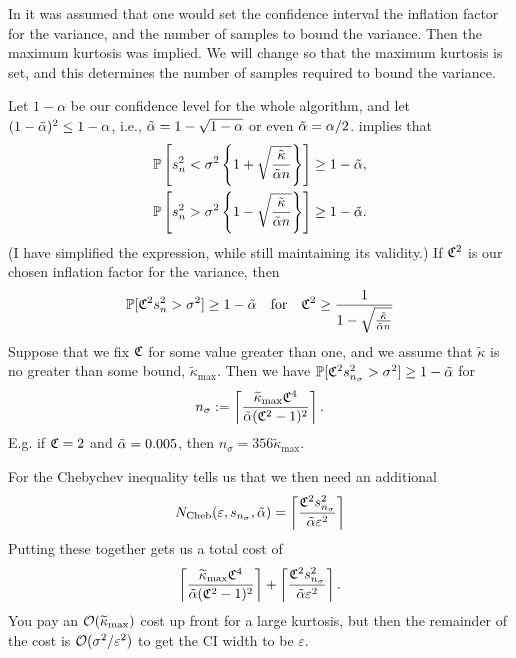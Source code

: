 \documentclass{amsart}
\newcommand{\tkappa}{\widetilde{\kappa}}
\newcommand{\tkmax}{\tkappa_{\max}}
\begin{document}
In \cite{HicEtal14a} it was assumed that one would set the confidence interval the inflation factor for the variance, and the number of samples to bound the variance.  Then the maximum kurtosis was implied.  We will change so that the maximum kurtosis is set, and this determines the number of samples required to bound the variance.

Let $1-\alpha$ be our confidence level for the whole algorithm, and let $(1 - \tilde{\alpha})^2 \le 1 - \alpha$, i.e., $\tilde{\alpha} = 1 - \sqrt{1-\alpha}$ or even $\tilde{\alpha} = \alpha/2$.   \citet[(12)]{HicEtal14a} implies that 
\begin{subequations} \label{sampvarbd}
	\begin{gather}\label{sampvarup}
		\operatorname{\mathbb{P}}\left[s^2_n < \sigma^2 \left\{1 + \sqrt{\frac{\tilde\kappa}{\tilde{\alpha} n}}\right\} \right] \ge 1 - \tilde{\alpha}, \\
		\label{sampvarlo}
		\operatorname{\mathbb{P}}\left[s^2_n > \sigma^2 \left\{1 - \sqrt{\frac{\tilde\kappa}{\tilde{\alpha} n}}\right\} \right] \ge 1 - \tilde{\alpha}.
	\end{gather}
\end{subequations}
(I have simplified the expression, while still maintaining its validity.)  If $\mathfrak{C}^2$ is our chosen inflation factor for the variance, then 
\begin{equation}
\label{sampvarlo_b}
\operatorname{\mathbb{P}}[\mathfrak{C}^2 s^2_n > \sigma^2] \ge 1 - \tilde{\alpha} \quad \text{for}  \quad \mathfrak{C}^2 \ge \frac{1}{1 - \sqrt{\frac{\tilde\kappa }{\tilde{\alpha} n}}} 
\end{equation}
Suppose that we fix $\mathfrak{C}$ for some value greater than one, and we assume that $\tkappa$ is no greater than some bound, $\tkmax$.  Then we have $\operatorname{\mathbb{P}}[\mathfrak{C}^2 s^2_{n_\sigma}> \sigma^2] \ge 1 - \tilde{\alpha} $ for  
\begin{equation}
	n_\sigma := \left \lceil \frac{\tkmax\fC^4}{\talpha(\fC^2-1)^2} \right \rceil.
\end{equation}
E.g. if $\mathfrak{C} = 2$ and $\tilde{\alpha} = 0.005$, then $n_\sigma = 356 \tkmax$.

For the Chebychev inequality \citet[(14)]{HicEtal14a} tells us that we then need an additional 
\[
N_{\text{Cheb}}(\varepsilon,s_{n_\sigma},\tilde{\alpha})
= 
\left\lceil\frac{\mathfrak{C}^2s_{n_\sigma}^2}{\tilde{\alpha}\varepsilon^2}\right\rceil
\]
Putting these together gets us a total cost of 
\[
\left \lceil \frac{\tkmax\fC^4}{\talpha(\fC^2-1)^2} \right \rceil + \left\lceil\frac{\fC^2s_{n_\sigma}^2}{\talpha\varepsilon^2}\right\rceil.
\]
You pay an $\Order(\tkmax)$ cost up front for a large kurtosis, but then the remainder of the cost is $\operatorname{{\mathcal O}}(\sigma^2/\varepsilon^2)$ to get the CI width to be $\varepsilon$.
\end{document}
